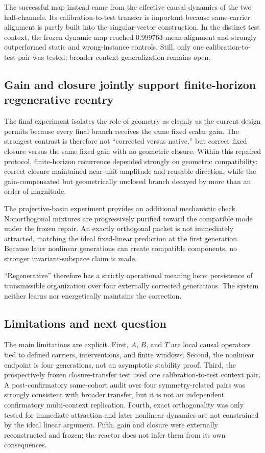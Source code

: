 \documentclass[aps,pre,preprint,superscriptaddress,nofootinbib]{revtex4-2}
\begin{document}
The successful map instead came from the effective causal dynamics of the two half-channels. Its calibration-to-test transfer is important because same-carrier alignment is partly built into the singular-vector construction. In the distinct test context, the frozen dynamic map reached $0.999763$ mean alignment and strongly outperformed static and wrong-instance controls. Still, only one calibration-to-test pair was tested; broader context generalization remains open.

\subsection{Gain and closure jointly support finite-horizon regenerative reentry}

The final experiment isolates the role of geometry as cleanly as the current design permits because every final branch receives the same fixed scalar gain. The strongest contrast is therefore not ``corrected versus native,'' but correct fixed closure versus the same fixed gain with no geometric closure. Within this repaired protocol, finite-horizon recurrence depended strongly on geometric compatibility: correct closure maintained near-unit amplitude and reusable direction, while the gain-compensated but geometrically unclosed branch decayed by more than an order of magnitude.

The projective-basin experiment provides an additional mechanistic check. Nonorthogonal mixtures are progressively purified toward the compatible mode under the frozen repair. An exactly orthogonal packet is not immediately attracted, matching the ideal fixed-linear prediction at the first generation. Because later nonlinear generations can create compatible components, no stronger invariant-subspace claim is made.

``Regenerative'' therefore has a strictly operational meaning here: persistence of transmissible organization over four externally corrected generations. The system neither learns nor energetically maintains the correction.

\subsection{Limitations and next question}

The main limitations are explicit. First, $A$, $B$, and $T$ are local causal operators tied to defined carriers, interventions, and finite windows. Second, the nonlinear endpoint is four generations, not an asymptotic stability proof. Third, the prospectively frozen closure-transfer test used one calibration-to-test context pair. A post-confirmatory same-cohort audit over four symmetry-related pairs was strongly consistent with broader transfer, but it is not an independent confirmatory multi-context replication. Fourth, exact orthogonality was only tested for immediate attraction and later nonlinear dynamics are not constrained by the ideal linear argument. Fifth, gain and closure were externally reconstructed and frozen; the reactor does not infer them from its own consequences.
\end{document}
